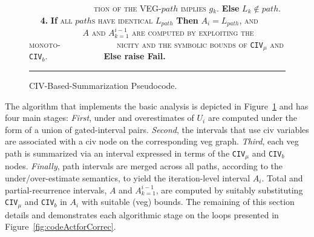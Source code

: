 \documentclass{sig-alternate}
\begin{document}
\begin{figure}[t]
\begin{small}
$\mbox{ }\mbox{ }\mbox{ }\mbox{ }\mbox{ }\mbox{ }\mbox{ }\mbox{ }\mbox{ }\mbox{ }\mbox{ }$
\textsc{tion of the VEG-$path$ implies $g_k$}. {\bf Else} $L_k \not\in path$.\vspace{2ex}\newline
$\mbox{ }\mbox{ }${\bf4.} {\bf If} \textsc{all $path$s have identical $L_{path}$} {\bf Then} $A_i = L_{path}$, \textsc{and}\vspace{1ex}\newline 
$\mbox{ }\mbox{ }\mbox{ }\mbox{ }\mbox{ }\mbox{ }\mbox{ }\mbox{ }\mbox{ }$
            \textsc{$A$ and $A_{k=1}^{i-1}$ are computed by exploiting the monoto-}\vspace{1ex}\newline 
$\mbox{ }\mbox{ }\mbox{ }\mbox{ }\mbox{ }\mbox{ }\mbox{ }\mbox{ }\mbox{ }$
\textsc{nicity and the symbolic bounds of {\tt CIV$_\mu$} {\sc and} {\tt CIV$_b$}.}\vspace{1ex}\newline
$\mbox{ }\mbox{ }\mbox{ }\mbox{ }\mbox{ }\mbox{ }\mbox{ }\mbox{ }\mbox{ }$ {\bf Else raise Fail.}\vspace{1ex}
\end{small}
\hrule
\caption{ CIV-Based-Summarization Pseudocode.}
\label{fig:BasicTechnique} %
\end{figure}


The algorithm that implements the basic analysis is depicted in 
Figure~\ref{fig:BasicTechnique} and has four main stages: 
{\em First}, under and overestimates of $U_i$ are computed under the form 
of a union of gated-interval pairs.   %
{\em Second}, the intervals that use {\sc civ} variables are 
associated with a {\sc civ} node on the corresponding {\sc veg} graph.
{\em Third}, each {\sc veg} path is summarized via an interval expressed 
in terms of the {\tt CIV$_\mu$} and {\tt CIV$_b$} nodes. 
{\em Finally}, path intervals are merged across all paths, according to 
the under/over-estimate semantics, to yield the iteration-level interval $A_i$.
Total and partial-recurrence intervals, $A$ and $A_{k=1}^{i-1}$, 
are computed by suitably substituting {\tt CIV$_\mu$} and 
{\tt CIV$_b$} in $A_i$ with suitable ({\sc veg}) bounds.
The remaining of this section details and demonstrates each algorithmic stage
on the loops presented in Figure~\ref{fig:codeActforCorrec}.

%
%
\end{document}
